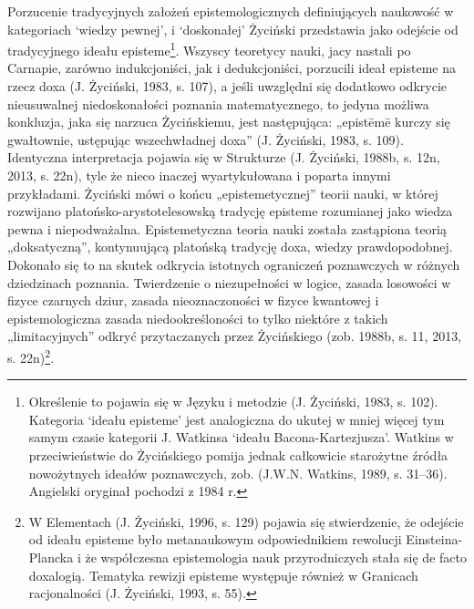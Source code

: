 \documentclass{article}
\begin{document}
Porzucenie tradycyjnych założeń epistemologicznych definiujących naukowość w kategoriach ‘wiedzy pewnej’, i ‘doskonałej’
Życiński przedstawia jako odejście od tradycyjnego ideału episteme\footnote{Określenie to pojawia się w Języku i
metodzie \label{ref:RNDVZe2UQr77Q}(J. Życiński, 1983, s. 102). Kategoria ‘ideału episteme’ jest analogiczna do ukutej w
mniej więcej tym samym czasie kategorii J. Watkinsa ‘ideału Bacona-Kartezjusza’. Watkins w przeciwieństwie do
Życińskiego pomija jednak całkowicie starożytne źródła nowożytnych ideałów poznawczych, zob.
\label{ref:RNDFZ4rQltK9B}(J.W.N. Watkins, 1989, s. 31–36). Angielski oryginał pochodzi z 1984 r.}. Wszyscy teoretycy
nauki, jacy nastali po Carnapie, zarówno indukcjoniści, jak i dedukcjoniści, porzucili ideał episteme na rzecz doxa
\label{ref:RNDFYiS161msr}(J. Życiński, 1983, s. 107), a jeśli uwzględni się dodatkowo odkrycie nieusuwalnej
niedoskonałości poznania matematycznego, to jedyna możliwa konkluzja, jaka się narzuca Życińskiemu, jest następująca:
„epist\=em\=e kurczy się gwałtownie, ustępując wszechwładnej doxa” \label{ref:RND0ssJjiFTXJ}(J. Życiński, 1983, s.
109). Identyczna interpretacja pojawia się w Strukturze \label{ref:RNDOxi36USGCm}(J. Życiński, 1988b, s. 12n, 2013, s.
22n), tyle że nieco inaczej wyartykułowana i poparta innymi przykładami. Życiński mówi o końcu „epistemetycznej” teorii
nauki, w której rozwijano platońsko-arystotelesowską tradycję episteme rozumianej jako wiedza pewna i niepodważalna.
Epistemetyczna teoria nauki została zastąpiona teorią „doksatyczną”, kontynuującą platońską tradycję doxa, wiedzy
prawdopodobnej. Dokonało się to na skutek odkrycia istotnych ograniczeń poznawczych w różnych dziedzinach poznania.
Twierdzenie o niezupełności w logice, zasada losowości w fizyce czarnych dziur, zasada nieoznaczoności w fizyce
kwantowej i epistemologiczna zasada niedookreśloności to tylko niektóre z takich „limitacyjnych” odkryć przytaczanych
przez Życińskiego \label{ref:RNDP7Ju9f9P3l}(zob. 1988b, s. 11, 2013, s. 22n)\footnote{W Elementach
\label{ref:RNDGof4TZDE7e}(J. Życiński, 1996, s. 129) pojawia się stwierdzenie, że odejście od ideału episteme było
metanaukowym odpowiednikiem rewolucji Einsteina-Plancka i że współczesna epistemologia nauk przyrodniczych stała się de
facto doxalogią. Tematyka rewizji episteme występuje również w Granicach racjonalności \label{ref:RNDEK9raCkAFp}(J.
Życiński, 1993, s. 55).}.
\end{document}
